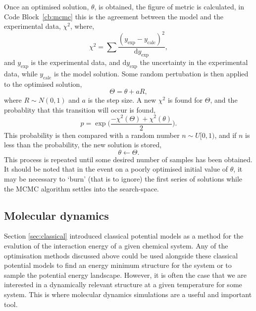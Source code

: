 Once an optimised solution, $\theta$, is obtained, the figure of metric is calculated, in Code Block~\ref{cb:mcmc} this is the agreement between the model and the experimental data, $\chi^2$, where,
%
\begin{equation}
\chi^2 = \sum\frac{(y_{\text{exp}} - y_{\text{calc}})^2}{\text{d}y_{\text{exp}}},
\end{equation}
%
and $y_{\text{exp}}$ is the experimental data, and $\text{d}y_{\text{exp}}$ the uncertainty in the experimental data, while $y_{\text{calc}}$ is the model solution.
Some random pertubation is then applied to the optimised solution,
%
\begin{equation}
\Theta = \theta + aR,
\end{equation}
%
where $R\sim N(0, 1)$ and $a$ is the step size.
A new $\chi^2$ is found for $\Theta$, and the probablity that this transition will occur is found,
%
\begin{equation}
p = \exp{\bigg(\frac{-\chi^2(\Theta) + \chi^2(\theta)}{2}\bigg)}.
\end{equation}
%
This probability is then compared with a random number $n\sim U[0, 1)$, and if $n$ is less than the probability, the new solution is stored,
%
\begin{equation}
\theta \leftarrow \Theta.
\end{equation}
%
This process is repeated until some desired number of samples has been obtained.
It should be noted that in the event on a poorly optimised initial value of $\theta$, it may be necessary to `burn' (that is to ignore) the first series of solutions while the MCMC algorithm settles into the search-space.

\subsection{Molecular dynamics}
\label{sec:md}
Section \ref{sec:classical} introduced classical potential models as a method for the evalution of the interaction energy of a given chemical system.
Any of the optimisation methods discussed above could be used alongside these classical potential models to find an energy minimum structure for the system or to sample the potential energy landscape.
However, it is often the case that we are interested in a dynamically relevant structure at a given temperature for some system.
This is where molecular dynamics simulations are a useful and important tool.

